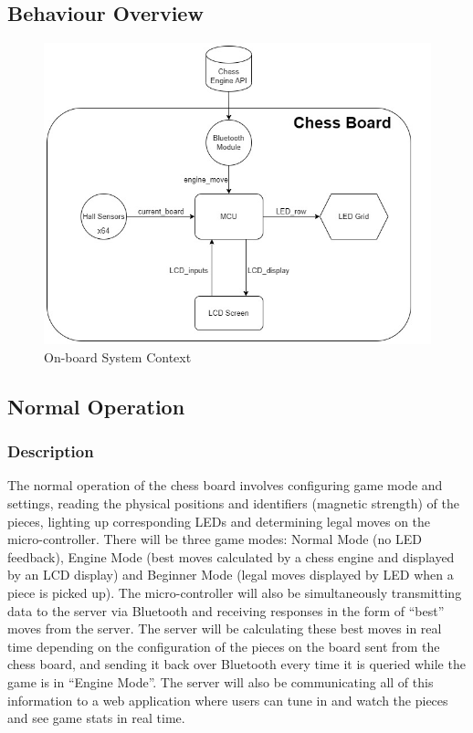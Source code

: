 \documentclass[12pt]{article}
\begin{document}
\subsection{Behaviour Overview}
\begin{figure}[H]
    \begin{center}
      \includegraphics[scale=0.8]{Hardware_System_Context_Diagram.jpg}
      \caption{On-board System Context}
      \label{Fig_SystemContext2} 
    \end{center}
  \end{figure}

\subsection{Normal Operation}
\subsubsection{Description}{
    The normal operation of the chess board involves configuring game mode and settings, reading the physical positions and identifiers (magnetic strength) of the pieces, 
    lighting up corresponding LEDs and determining legal moves on the micro-controller. There will be three game modes: Normal Mode (no LED feedback), Engine Mode (best moves 
    calculated by a chess engine and displayed by an LCD display) and Beginner Mode (legal moves displayed by LED when a piece is picked up). The micro-controller will also be 
    simultaneously transmitting data to the server via Bluetooth and receiving responses in the form of ``best'' moves from the server. The server will be calculating these 
    best moves in real time depending on the configuration of the pieces on the board sent from the chess board, and sending it back over Bluetooth every time it is queried
    while the game is in ``Engine Mode''. The server will also be communicating all of this information to a web application where users can tune in and watch the pieces and see
    game stats in real time.
}
\end{document}
